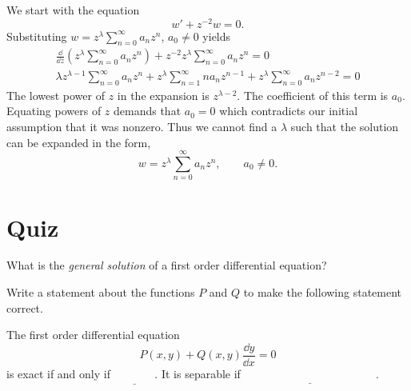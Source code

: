 {  %
  \begin{Solution} 
    \label{solution dwdz z-2 w}
    We start with the equation
    \[ 
    w' + z^{-2}w = 0.
    \]
    Substituting $w = z^\lambda \sum_{n=0}^\infty a_n z^n$, $a_0 \neq 0$ yields
    \begin{gather*}
      \frac{\dd}{\dd z} \left(z^\lambda \sum_{n=0}^\infty a_n z^n\right) + 
      z^{-2}z^\lambda \sum_{n=0}^\infty a_n z^n = 0 \\
      \lambda z^{\lambda-1} \sum_{n=0}^\infty a_n z^n 
      + z^\lambda \sum_{n=1}^\infty n a_n z^{n-1}
      + z^\lambda \sum_{n=0}^\infty a_n z^{n-2} = 0
    \end{gather*}
    The lowest power of $z$ in the expansion is $z^{\lambda-2}$.  The 
    coefficient of this term is $a_0$.  Equating powers of $z$ demands that
    $a_0 = 0$ which contradicts our initial assumption that it was nonzero.
    Thus we cannot find a $\lambda$ such that the solution can be expanded
    in the form,
    \[ 
    w = z^\lambda \sum_{n=0}^\infty a_n z^n, \qquad a_0 \neq 0.
    \]
  \end{Solution}

  

\raggedbottom
}
\pagebreak
\flushbottom
\section{Quiz}


\begin{QuizProblem}
  \label{quiz problem general solution first order}
  What is the \textit{general solution} of a first order 
  differential equation?

\end{QuizProblem}


\begin{QuizProblem}
  \label{quiz problem first order exact separable}
  Write a statement about the functions $P$ and $Q$ to make the following 
  statement correct.

  The first order differential equation
  \[
  P(x, y) + Q(x, y) \frac{\dd y}{\dd x} = 0
  \]
  is exact if and only if $\underline{\phantom{P_y = Q_x}}$.
  It is separable if $\underline{\phantom{P = P(x) and Q = Q(y)}}$.

\end{QuizProblem}


